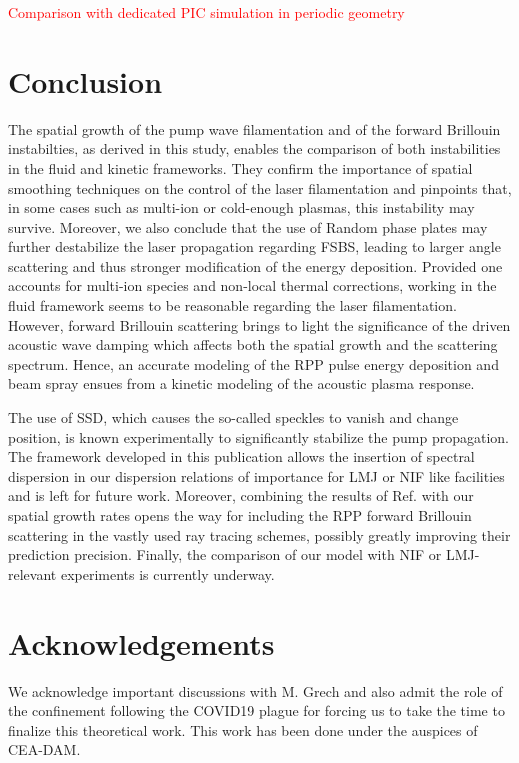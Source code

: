 \documentclass[
 reprint,
 amsmath,amssymb,
 aps,
]{revtex4-1}
\begin{document}
\textcolor{red}{Comparison with dedicated PIC simulation in periodic geometry}


\section{Conclusion}
The spatial growth of the  pump wave filamentation and of the forward Brillouin instabilties, as derived in this study, enables the comparison of both instabilities in the fluid and kinetic frameworks. They confirm the importance  of spatial smoothing techniques on the control of the laser filamentation and pinpoints that, in some cases such as multi-ion  or cold-enough  plasmas, this instability may survive.
Moreover, we also conclude that the use of Random phase plates may further destabilize the laser propagation   regarding FSBS,  leading to larger angle scattering and thus stronger modification of the energy deposition.
Provided one accounts for multi-ion species and non-local thermal corrections, working in the fluid framework seems to be reasonable regarding the laser filamentation. However, forward Brillouin scattering brings to light the significance of   the driven acoustic  wave damping which affects both the spatial growth  and the  scattering spectrum. 
Hence, an accurate modeling of the RPP pulse energy deposition and beam spray ensues from a kinetic modeling of the acoustic plasma response.

The use of SSD, which  causes the so-called speckles to vanish and change position, is known  experimentally to significantly stabilize the pump propagation. The framework developed in this publication  allows the insertion of spectral dispersion in our dispersion relations of importance for LMJ or NIF like facilities  and is left for future work. Moreover, 
combining the results of  Ref. \cite[]{POP_Debayle_2019} with our spatial growth rates opens the way for 
including the RPP forward Brillouin scattering   in the vastly used ray tracing schemes, possibly greatly improving their prediction precision.
Finally, the comparison of our model with NIF or LMJ-relevant experiments is currently underway. 


\section*{Acknowledgements}
We acknowledge important discussions with M. Grech and also admit the role of the confinement following the COVID19 plague for forcing us to take the time to finalize this theoretical work. This work has been done under the auspices of CEA-DAM. 

\end{document}
